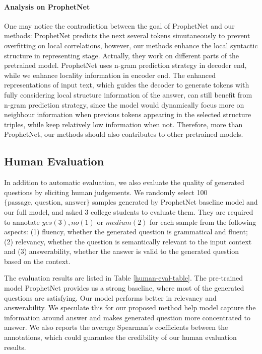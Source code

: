 \documentclass[11pt]{article}
\begin{document}
\paragraph{Analysis on ProphetNet} One may notice the contradiction between the goal of ProphetNet and our methods: ProphetNet predicts the next several tokens simutaneously to prevent overfitting on local correlations, however, our methods enhance the local syntactic structure in representing stage. Actually, they work on different parts of the pretrained model. ProphetNet uses n-gram prediction strategy in decoder end, while we enhance locality information in encoder end. The enhanced representations of input text, which guides the decoder to generate tokens with fully considering local structure information of the answer, can still benefit from n-gram prediction strategy, since the model would dynamically focus more on neighbour information when previous tokens appearing in the selected structure triples, while keep relatively low information when not. Therefore, more than ProphetNet, our methods should also contributes to other pretrained models.
\subsection{Human Evaluation}
In addition to automatic evaluation, we also evaluate the quality of generated questions by eliciting human judgements. We randomly select 100 $\{\textrm{passage, question, answer}\}$ samples generated by ProphetNet baseline model and our full model, and asked 3 college students to evaluate them. They are required to annotate $yes(3), no(1)$ or $medium(2)$ for each sample from the following aspects: (1) fluency, whether the generated question is grammatical and fluent; (2) relevancy, whether the question is semantically relevant to the input context and (3) answerability, whether the answer is valid to the generated question based on the context. 


The evaluation results are listed in Table \ref{human-eval-table}. The pre-trained model ProphetNet provides us a strong baseline, where most of the generated questions are satisfying. Our model performs better in relevancy and answerability. We speculate this for our proposed method help model capture the information around answer and makes generated question more concentrated to answer. We also reports the average Spearman's coefficients between the annotations, which could guarantee the credibility of our human evaluation results.
\end{document}
